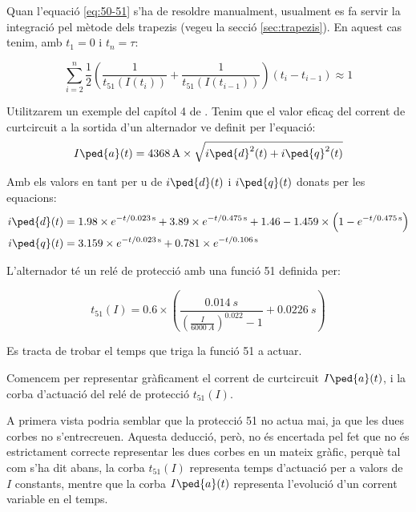 Quan l'equació \eqref{eq:50-51} s'ha de resoldre manualment, usualment es fa servir la integració pel mètode dels trapezis (vegeu la secció \vref{sec:trapezis}). En aquest cas tenim, amb $t_1 = 0$ i $t_n = \tau$:

\begin{equation}\label{eq:50-51-aprox}
	\sum_{i=2}^n \frac{1}{2} \left( \frac{1}{t_{51}(I(t_i))} + \frac{1}{t_{51}(I(t_{i-1}))} \right) (t_i - t_{i-1}) \approx 1
\end{equation}


\begin{exemple}\label{ex:ProtInvIntVar}
	\addcontentsxms{\ProtInvIntVar}	
	Utilitzarem un exemple del capítol 4 de \cite{REI}. Tenim que el valor eficaç del corrent de curtcircuit a la sortida d'un alternador ve definit per l'equació:
	\[
	I\ped{a}(t) = \qty{4368}{A} \times \sqrt{i\ped{d}^2(t) + i\ped{q}^2(t)}
	\]
	
	Amb els valors en tant per u de $i\ped{d}(t)$ i $i\ped{q}(t)$ donats per les equacions:
	\begin{align*}
		i\ped{d}(t) &= \num{1,98} \times e^{-t/\qty{0,023}{s}} + \num{3,89} \times e^{-t/\qty{0,475}{s}} + \num{1,46} - \num{1,459} \times \left( 1 - e^{-t/\qty{0,475}{s}}\right) \\
		i\ped{q}(t) &= 	\num{3,159} \times e^{-t/\qty{0,023}{s}} + \num{0,781} \times e^{-t/\qty{0,106}{s}}
	\end{align*}
	
	L'alternador té un relé de protecció amb una funció 51 definida per:
	
	\[
	t_{51}(I) = \num{0,6} \times \left(  \frac{\qty{0,014}{s}}{\left( \frac{I}{\qty{6000}{A}} \right) ^{\num{0,022}} -1} + \qty{0,0226}{s} \right)  
	\]
	
	Es tracta de trobar el temps que triga la funció 51 a actuar.
	
	Comencem per representar gràficament el corrent de curtcircuit $I\ped{a}(t)$, i la corba d'actuació del relé de protecció $t_{51}(I)$.
	
	\begin{center}
		
	\end{center}
	
	A primera vista podria semblar que la protecció 51 no actua mai, ja que les dues corbes no s'entrecreuen. Aquesta deducció, però,  no és encertada pel fet que  no és estrictament correcte representar les dues corbes en un mateix gràfic, perquè tal com s'ha dit abans, la corba $t_{51}(I)$ representa temps d'actuació per a valors de $I$ constants, mentre que la corba $I\ped{a}(t)$ representa l'evolució d'un corrent variable en el temps.
	

\end{exemple}
